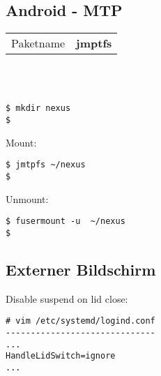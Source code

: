 \subsection{Android - MTP}
\begin{tabular}{l|l}
Paketname & \textbf{jmptfs} \\ 
\end{tabular}
\\ \\
\begin{lstlisting}[style=Bash]
$ mkdir nexus 
$
\end{lstlisting}
Mount: 
\begin{lstlisting}[style=Bash]
$ jmtpfs ~/nexus
$
\end{lstlisting}
Unmount: 
\begin{lstlisting}[style=Bash]
$ fusermount -u  ~/nexus
$
\end{lstlisting}

\subsection{Externer Bildschirm}
Disable suspend on lid close:
\begin{lstlisting}[style=Bash]
# vim /etc/systemd/logind.conf
------------------------------
...
HandleLidSwitch=ignore
...
\end{lstlisting}
